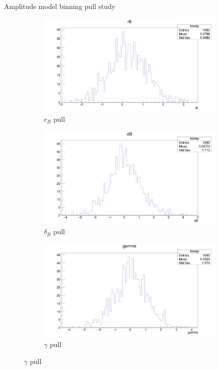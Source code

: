 \documentclass{beamer}
\begin{document}
\begin{frame}{Amplitude model binning pull study}
  \begin{figure}
    \centering
    \vspace{-0.2cm}
    \begin{subfigure}{0.5\textwidth}
      \includegraphics[width = 1.0\textwidth]{AmplitudePulls/rB1K1K.png}
      \caption{$r_B$ pull}
    \end{subfigure}%
    \begin{subfigure}{0.5\textwidth}
      \includegraphics[width = 1.0\textwidth]{AmplitudePulls/dB1K1K.png}
      \caption{$\delta_B$ pull}
    \end{subfigure}
    \begin{subfigure}{0.5\textwidth}
      \includegraphics[width = 1.0\textwidth]{AmplitudePulls/gamma1K1K.png}
      \caption{$\gamma$ pull}
    \end{subfigure}
  \end{figure}
\end{frame}
\end{document}
